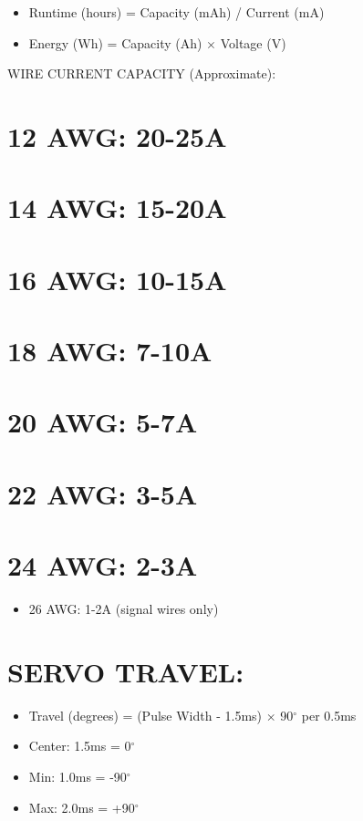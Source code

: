 \documentclass[11pt,letterpaper]{article}
\begin{document}
\begin{itemize}
  \item Runtime (hours) = Capacity (mAh) / Current (mA)
  \item Energy (Wh) = Capacity (Ah) $\times$ Voltage (V)
\end{itemize}

WIRE CURRENT CAPACITY (Approximate):\par

\section{12 AWG: 20-25A}

\section{14 AWG: 15-20A}

\section{16 AWG: 10-15A}

\section{18 AWG: 7-10A}

\section{20 AWG: 5-7A}

\section{22 AWG: 3-5A}

\section{24 AWG: 2-3A}

\begin{itemize}
  \item 26 AWG: 1-2A (signal wires only)
\end{itemize}

\section{SERVO TRAVEL:}

\begin{itemize}
  \item Travel (degrees) = (Pulse Width - 1.5ms) $\times$ 90$^\circ$ per 0.5ms
  \item Center: 1.5ms = 0$^\circ$
  \item Min: 1.0ms = -90$^\circ$
  \item Max: 2.0ms = +90$^\circ$
\end{itemize}
\end{document}
